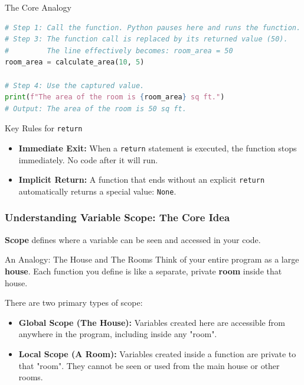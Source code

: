 \documentclass{beamer}
\begin{document}
\begin{frame}[fragile]
\begin{block}{The Core Analogy}
\begin{frame}[fragile]
\begin{lstlisting}[language=Python]
# Step 1: Call the function. Python pauses here and runs the function.
# Step 3: The function call is replaced by its returned value (50).
#         The line effectively becomes: room_area = 50
room_area = calculate_area(10, 5)

# Step 4: Use the captured value.
print(f"The area of the room is {room_area} sq ft.")
# Output: The area of the room is 50 sq ft.
    \end{lstlisting}
    
    \begin{block}{Key Rules for \texttt{return}}
        \begin{itemize}
            \item \textbf{Immediate Exit:} When a \texttt{return} statement is executed, the function stops immediately. No code after it will run.
            \item \textbf{Implicit Return:} A function that ends without an explicit \texttt{return} automatically returns a special value: \texttt{None}.
        \end{itemize}
    \end{block}
    
\end{frame}

\begin{frame}[fragile]
    \frametitle{Understanding Variable Scope: The Core Idea}
    \textbf{Scope} defines where a variable can be seen and accessed in your code.
    
    \begin{block}{An Analogy: The House and The Rooms}
        Think of your entire program as a large \textbf{house}. Each function you define is like a separate, private \textbf{room} inside that house.
    \end{block}
    
    There are two primary types of scope:
    \begin{itemize}
        \item \textbf{Global Scope (The House):} Variables created here are accessible from anywhere in the program, including inside any "room".
        
        \item \textbf{Local Scope (A Room):} Variables created inside a function are private to that "room". They cannot be seen or used from the main house or other rooms.
    \end{itemize}
    
\end{frame}


\end{block}
\end{frame}
\end{document}
